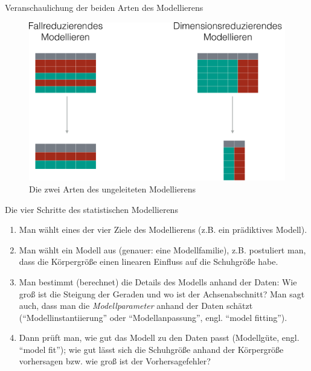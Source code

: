\begin{frame}{Veranschaulichung der beiden Arten des Modellierens}

\begin{figure}

{\centering \includegraphics[width=0.8\linewidth]{../images/modellieren/ungeleitetes_Modellieren_crop} 

}

\caption{Die zwei Arten des ungeleiteten Modellierens}\label{fig:ungeleitetes-modellieren}
\end{figure}

\end{frame}

\begin{frame}{Die vier Schritte des statistischen Modellierens}

\begin{enumerate}
\def\labelenumi{\arabic{enumi}.}
\tightlist
\item
  Man wählt eines der vier Ziele des Modellierens (z.B. ein prädiktives
  Modell).
\item
  Man wählt ein Modell aus (genauer: eine Modellfamilie), z.B.
  postuliert man, dass die Körpergröße einen linearen Einfluss auf die
  Schuhgröße habe.
\item
  Man bestimmt (berechnet) die Details des Modells anhand der Daten: Wie
  groß ist die Steigung der Geraden und wo ist der Achsenabschnitt? Man
  sagt auch, dass man die \emph{Modellparameter} anhand der Daten
  schätzt (``Modellinstantiierung'' oder ``Modellanpassung'', engl.
  ``model fitting'').
\item
  Dann prüft man, wie gut das Modell zu den Daten passt (Modellgüte,
  engl. ``model fit''); wie gut lässt sich die Schuhgröße anhand der
  Körpergröße vorhersagen bzw. wie groß ist der Vorhersagefehler?
\end{enumerate}

\end{frame}

